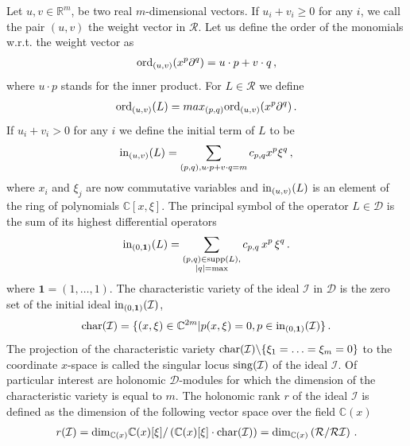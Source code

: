 \documentclass[11pt]{article}
\newcommand{\brk}[1]{(#1)}
\newcommand{\cD}{\mathcal{D}}
\newcommand{\cI}{\mathcal{I}}
\begin{document}
Let $u,v \in \mathbb{R}^{m}$, be two real $m$-dimensional vectors. If $u_{i}+v_{i} \geq 0$ for any $i$, we call the pair $(u,v)$ the weight vector in $\mathcal{R}$. Let us define the order of the monomials w.r.t. the weight vector as
\begin{align}
{\rm ord}_{(u,v)}(x^{p} \partial^{q}) = u \cdot p + v \cdot q \,,     
\end{align}
where $u \cdot p$ stands for the inner product. For $L \in \mathcal{R}$ we define
\begin{align}
{\rm ord}_{(u,v)}(L) = max_{(p,q)} {\rm ord}_{(u,v)} (x^{p} \partial^{q}) \,.   
\end{align}
If $u_{i} + v_{i} > 0 $ for any $i$ we define the initial term of $L$ to be
\begin{align}
{\rm in}_{(u,v)}(L) = \sum_{(p,q), u\cdot p + v \cdot q = m} c_{p,q} x^{p} \xi^{q} \,,     
\end{align}
where $x_{i}$ and $\xi_{j}$ are now commutative variables and ${\rm in}_{(u,v)}(L)$ is an element of the ring of polynomials $\mathbb{C}[x,\xi]$.
The principal symbol of the operator $L \in \mathcal{D}$ is the sum of its highest differential operators
\begin{align}
{\rm in}_{(0,\mathbf{1})}(L) = \sum_{\substack{(p,q) \in {\rm supp}(L), \\ 
\vert q \vert={\rm max}}} c_{p,q} \, x^{p} \,  \xi^{q}\,.   
\end{align}
where $\mathbf{1}= (1,\hdots,1)$. The characteristic variety of the ideal $\cI$ in $\mathcal{D}$ is the zero set of the initial ideal ${\rm in}_{(0,\mathbf{1})}(\mathcal{I})$,
\begin{align}
{\rm char}(\mathcal{I}) = \lbrace (x,\xi)\in \mathbb{C}^{2m} \vert p(x,\xi) = 0, p \in {\rm in}_{(0,\mathbf{1})}(\mathcal{I})    \rbrace \,.    
\end{align}
The projection of the characteristic variety ${\rm char}(\mathcal{I})\backslash \lbrace \xi_{1}=\ldots=\xi_{m}=0 \rbrace$ to the coordinate $x$-space is called the singular locus ${\rm sing}(\mathcal{I})$ of the ideal $\mathcal{I}$.
Of particular interest are holonomic $\cD$-modules for which the dimension of the characteristic variety is equal to $m$. The holonomic rank $r$ of the ideal $\cI$ is defined as the dimension of the following vector space over the field $\mathbb{C}(x)$
\begin{align}
    r(\cI) = \text{dim}_{\mathbb{C}\brk{x}}\mathbb{C}(x)[\xi]/\left( \mathbb{C}(x)[\xi] \cdot 
    {\rm char}(\mathcal{I}) \right)  = \text{dim}_{\mathbb{C}\brk{x}} \left( \mathcal{R} / \mathcal{R} \mathcal{I} \right)\,.
    \label{eq:holonomic_rank}
\end{align}
\end{document}
